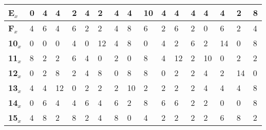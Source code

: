 \begin{longtable}[c]{|l|l|l|l|l|l|l|l|l|l|l|l|l|l|l|l|l|}
\textbf{E$_x$}  & 0              & 4              & 4              & 2              & 4              & 2              & 4              & 4              & 10             & 4              & 4              & 4              & 4              & 4              & 2              & 8              \\ \hline
\textbf{F$_x$}  & 4              & 6              & 4              & 6              & 2              & 2              & 4              & 8              & 6              & 2              & 6              & 2              & 0              & 6              & 2              & 4              \\ \hline
\textbf{10$_x$} & 0              & 0              & 0              & 4              & 0              & 12             & 4              & 8              & 0              & 4              & 2              & 6              & 2              & 14             & 0              & 8              \\ \hline
\textbf{11$_x$} & 8              & 2              & 2              & 6              & 4              & 0              & 2              & 0              & 8              & 4              & 12             & 2              & 10             & 0              & 2              & 2              \\ \hline
\textbf{12$_x$} & 0              & 2              & 8              & 2              & 4              & 8              & 0              & 8              & 8              & 0              & 2              & 2              & 4              & 2              & 14             & 0              \\ \hline
\textbf{13$_x$} & 4              & 4              & 12             & 0              & 2              & 2              & 2              & 10             & 2              & 2              & 2              & 2              & 4              & 4              & 4              & 8              \\ \hline
\textbf{14$_x$} & 0              & 6              & 4              & 4              & 6              & 4              & 6              & 2              & 8              & 6              & 6              & 2              & 2              & 0              & 0              & 8              \\ \hline
\textbf{15$_x$} & 4              & 8              & 2              & 8              & 2              & 4              & 8              & 0              & 4              & 2              & 2              & 2              & 2              & 6              & 8              & 2              \\ \hline

\end{longtable}
